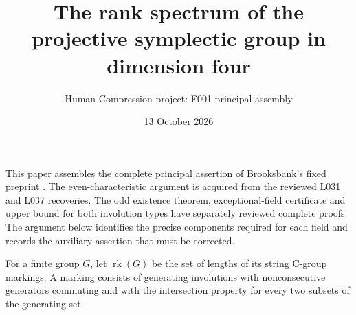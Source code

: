 \documentclass[11pt,a4paper]{article}
\title{The rank spectrum of the projective symplectic group in dimension four}
\author{Human Compression project: F001 principal assembly}
\date{13 October 2026}
\newcommand{\rk}{\operatorname{rk}}
\begin{document}
\maketitle
This paper assembles the complete principal assertion of Brooksbank's
fixed preprint \cite[Theorem~1.1]{B}. The even-characteristic argument
is acquired from the reviewed L031 and L037 recoveries. The odd
existence theorem, exceptional-field certificate and upper bound
for both involution types have separately reviewed complete proofs.
The argument below identifies the precise components required for
each field and records the auxiliary assertion that must be corrected.

For a finite group $G$, let $\rk(G)$ be the set of lengths of its
string C-group markings. A marking consists of generating involutions
with nonconsecutive generators commuting and with the intersection
property for every two subsets of the generating set.
\end{document}
